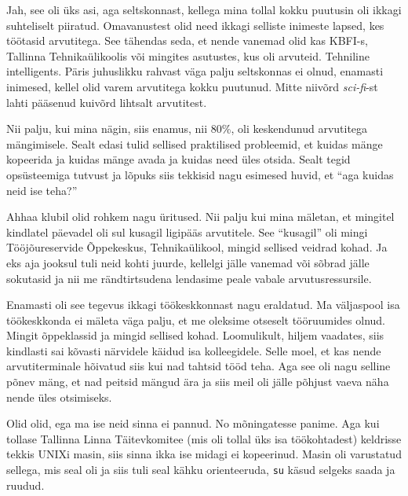 
Jah, see oli üks asi, aga seltskonnast, kellega mina tollal kokku puutusin oli ikkagi suhteliselt piiratud. Omavanustest olid need ikkagi selliste inimeste lapsed, kes töötasid arvutitega. See tähendas seda, et nende vanemad olid kas KBFI-s, Tallinna Tehnikaülikoolis või mingites asutustes, kus oli arvuteid. Tehniline intelligents. Päris juhuslikku rahvast väga palju seltskonnas ei olnud, enamasti inimesed, kellel olid varem arvutitega kokku puutunud. Mitte niivõrd \emph{sci-fi}-st lahti pääsenud kuivõrd lihtsalt arvutitest.

Nii palju, kui mina nägin, siis enamus, nii 80\%, oli keskendunud arvutitega mängimisele. Sealt edasi tulid sellised praktilised probleemid, et kuidas mänge kopeerida ja kuidas mänge avada ja kuidas need üles otsida. Sealt tegid opsüsteemiga tutvust ja lõpuks siis tekkisid nagu esimesed huvid, et \enquote{aga kuidas neid ise teha?}
                 

Ahhaa klubil olid rohkem nagu üritused. Nii palju kui mina mäletan, et mingitel kindlatel päevadel oli sul kusagil ligipääs arvutitele. See \enquote{kusagil} oli mingi Tööjõureservide Õppekeskus, Tehnikaülikool, mingid sellised veidrad kohad.
Ja eks aja jooksul tuli neid kohti juurde, kellelgi jälle vanemad või sõbrad jälle sokutasid ja nii me rändtirtsudena lendasime peale vabale arvutusressursile.

                 
Enamasti oli see tegevus ikkagi  töökeskkonnast nagu eraldatud. Ma väljaspool isa töökeskkonda ei mäleta väga palju, et me oleksime otseselt tööruumides olnud. Mingit õppeklassid ja mingid sellised kohad. Loomulikult, hiljem vaadates, siis kindlasti sai kõvasti närvidele käidud isa kolleegidele. Selle moel, et kas nende arvutiterminale hõivatud siis kui nad tahtsid tööd teha. Aga see oli nagu selline põnev mäng, et nad peitsid mängud ära ja siis meil oli jälle põhjust vaeva näha nende üles otsimiseks.


Olid olid, ega ma ise neid sinna ei pannud. No mõningatesse panime. Aga  kui tollase Tallinna Linna Täitevkomitee (mis oli tollal üks isa töökohtadest) keldrisse tekkis UNIXi masin, siis sinna ikka ise midagi  ei kopeerinud. Masin oli  varustatud sellega, mis seal oli ja siis tuli seal kähku orienteeruda, \verb|su| käsud selgeks saada ja ruudud.


